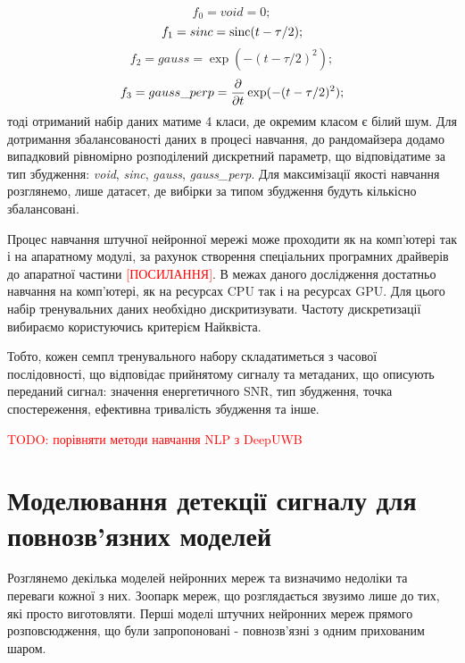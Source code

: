 \begin{equation} \label{eq:type_void}
f_0 = void = 0;
\end{equation}
%
\begin{equation} \label{eq:type_sinc}
f_1 = sinc = \operatorname{sinc}(t-\tau/2);
\end{equation}
%
\begin{equation} \label{eq:type_gauss}
f_2 = gauss = \exp(- (t-\tau/2)^2 );
\end{equation}
%
\begin{equation} \label{eq:type_gauss_perp}
f_3 = gauss\_perp = \frac{\partial }{\partial t} \exp(- (t-\tau/2)^2 );
\end{equation}
%
тоді отриманий набір даних матиме 4 класи, де окремим класом є білий шум. Для
дотримання збалансованості даних в процесі навчання, до рандомайзера додамо 
випадковий рівномірно розподілений дискретний параметр, що відповідатиме 
за тип збудження: \textit{void}, \textit{sinc}, \textit{gauss}, 
\textit{gauss\_perp}. Для максимізації якості навчання розглянемо, 
лише датасет, де вибірки за типом збудження будуть кількісно збалансовані. 

Процес навчання штучної нейронної мережі може проходити як на комп'ютері так і 
на апаратному модулі, за рахунок створення спеціальних програмних драйверів
до апаратної частини \textcolor{red}{[ПОСИЛАННЯ]}. В межах даного дослідження 
достатньо навчання на комп'ютері, як на ресурсах CPU так і на ресурсах GPU.
Для цього набір тренувальних даних необхідно дискритизувати. Частоту 
дискретизації вибираємо користуючись критерієм Найквіста.

Тобто, кожен семпл тренувального набору складатиметься з часової
послідовності, що відповідає прийнятому сигналу та метаданих, що описують 
переданий сигнал: значення енергетичного SNR, тип збудження, 
точка спостереження, ефективна тривалість збудження та інше.

\textcolor{red}{TODO: порівняти методи навчання NLP з DeepUWB}

\section{Моделювання детекції сигналу для повнозв'язних моделей}

Розглянемо декілька моделей нейронних мереж та визначимо недоліки та переваги
кожної з них. Зоопарк мереж, що розглядається звузимо лише до тих, які 
просто виготовляти. Перші моделі штучних нейронних мереж прямого 
розповсюдження, що були запропоновані - повнозв'язні з одним прихованим шаром.

